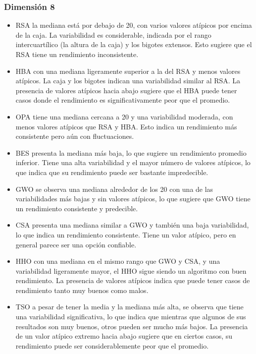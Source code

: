 \documentclass[conference]{IEEEtran}
\begin{document}
\subsubsection{Dimensión 8}
\begin{itemize}
\item RSA la mediana está por debajo de 20, con varios valores atípicos por encima de la caja. La variabilidad es considerable, indicada por el rango intercuartílico (la altura de la caja) y los bigotes extensos. Esto sugiere que el RSA tiene un rendimiento inconsistente.

\item HBA con una mediana ligeramente superior a la del RSA y menos valores atípicos. La caja y los bigotes indican una variabilidad similar al RSA. La presencia de valores atípicos hacia abajo sugiere que el HBA puede tener casos donde el rendimiento es significativamente peor que el promedio.

\item OPA tiene una mediana cercana a 20 y una variabilidad moderada, con menos valores atípicos que RSA y HBA. Esto indica un rendimiento más consistente pero aún con fluctuaciones.

\item BES presenta la mediana más baja, lo que sugiere un rendimiento promedio inferior. Tiene una alta variabilidad y el mayor número de valores atípicos, lo que indica que su rendimiento puede ser bastante impredecible.

\item GWO se observa una mediana alrededor de los 20 con una de las variabilidades más bajas y sin valores atípicos, lo que sugiere que GWO tiene un rendimiento consistente y predecible.

\item CSA presenta una mediana similar a GWO y también una baja variabilidad, lo que indica un rendimiento consistente. Tiene un valor atípico, pero en general parece ser una opción confiable.

\item HHO con una mediana en el mismo rango que GWO y CSA, y una variabilidad ligeramente mayor, el HHO sigue siendo un algoritmo con buen rendimiento. La presencia de valores atípicos indica que puede tener casos de rendimiento tanto muy buenos como malos.

\item TSO a pesar de tener la media y la mediana más alta, se observa que tiene una variabilidad significativa, lo que indica que mientras que algunos de sus resultados son muy buenos, otros pueden ser mucho más bajos. La presencia de un valor atípico extremo hacia abajo sugiere que en ciertos casos, su rendimiento puede ser considerablemente peor que el promedio.
\end{itemize}
\end{document}
